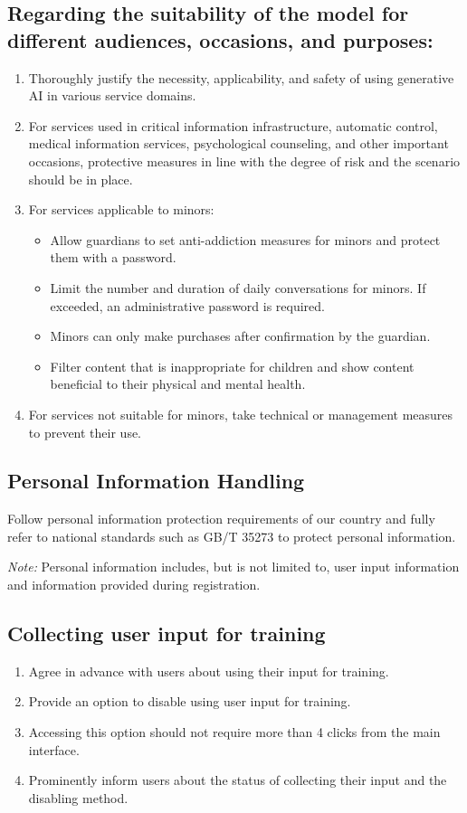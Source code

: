 \documentclass{article}
\begin{document}
\subsection{Regarding the suitability of the model for different audiences, occasions, and purposes:}
\begin{enumerate}
    \item Thoroughly justify the necessity, applicability, and safety of using generative AI in various service domains.
    \item For services used in critical information infrastructure, automatic control, medical information services, psychological counseling, and other important occasions, protective measures in line with the degree of risk and the scenario should be in place.
    \item For services applicable to minors:
    \begin{itemize}
        \item Allow guardians to set anti-addiction measures for minors and protect them with a password.
        \item Limit the number and duration of daily conversations for minors. If exceeded, an administrative password is required.
        \item Minors can only make purchases after confirmation by the guardian.
        \item Filter content that is inappropriate for children and show content beneficial to their physical and mental health.
    \end{itemize}
    \item For services not suitable for minors, take technical or management measures to prevent their use.
\end{enumerate}

\subsection{Personal Information Handling}
Follow personal information protection requirements of our country and fully refer to national standards such as GB/T 35273 to protect personal information.

\noindent \textit{Note:} Personal information includes, but is not limited to, user input information and information provided during registration.

\subsection{Collecting user input for training}
\begin{enumerate}
    \item Agree in advance with users about using their input for training.
    \item Provide an option to disable using user input for training.
    \item Accessing this option should not require more than 4 clicks from the main interface.
    \item Prominently inform users about the status of collecting their input and the disabling method.
\end{enumerate}
\end{document}
